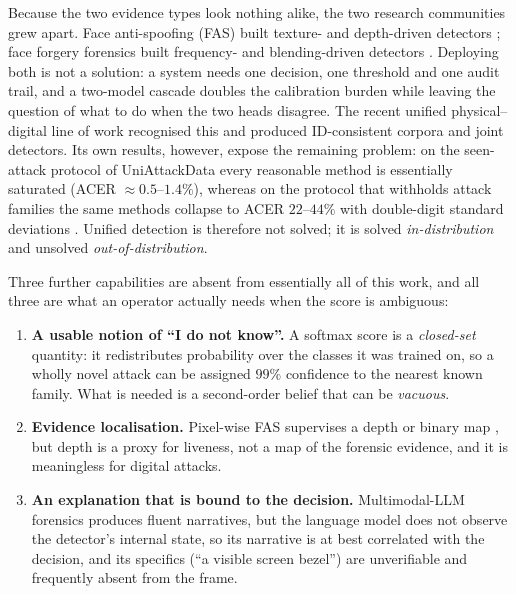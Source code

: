 \documentclass[conference]{IEEEtran}
\begin{document}
Because the two evidence types look nothing alike, the two research communities
grew apart. Face anti-spoofing (FAS) built texture- and depth-driven detectors
\cite{liu2018auxiliary,yu2020cdcn,yu2021revisiting,wang2022ssan}; face forgery
forensics built frequency- and blending-driven detectors
\cite{rossler2019ff,li2020celebdf,frank2020frequency,wang2020cnnspot}. Deploying
both is not a solution: a system needs one decision, one threshold and one audit
trail, and a two-model cascade doubles the calibration burden while leaving the
question of what to do when the two heads disagree. The recent unified
physical--digital line of work
\cite{yu2024unified,yuan2024challenge,ma2025uniattackplus,chen2025uniattack,zhang2024unidefense}
recognised this and produced ID-consistent corpora and joint detectors. Its own
results, however, expose the remaining problem: on the seen-attack protocol of
UniAttackData every reasonable method is essentially saturated (ACER $\approx
0.5$--$1.4\%$), whereas on the protocol that withholds attack families the same
methods collapse to ACER $22$--$44\%$ with double-digit standard deviations
\cite{yu2024unified}. Unified detection is therefore not solved; it is solved
\emph{in-distribution} and unsolved \emph{out-of-distribution}.

Three further capabilities are absent from essentially all of this work, and all
three are what an operator actually needs when the score is ambiguous:

\begin{enumerate}
\item \textbf{A usable notion of ``I do not know''.} A softmax score is a
      \emph{closed-set} quantity: it redistributes probability over the classes it
      was trained on, so a wholly novel attack can be assigned $99\%$ confidence to
      the nearest known family. What is needed is a second-order belief that can be
      \emph{vacuous}.
\item \textbf{Evidence localisation.} Pixel-wise FAS supervises a depth or binary
      map \cite{yu2021revisiting,liu2018auxiliary}, but depth is a proxy for
      liveness, not a map of the forensic evidence, and it is meaningless for
      digital attacks.
\item \textbf{An explanation that is bound to the decision.} Multimodal-LLM
      forensics \cite{huang2024ffaa,guo2025m2f2det} produces fluent narratives, but
      the language model does not observe the detector's internal state, so its
      narrative is at best correlated with the decision, and its specifics (``a
      visible screen bezel'') are unverifiable and frequently absent from the
      frame.
\end{enumerate}
\end{document}
